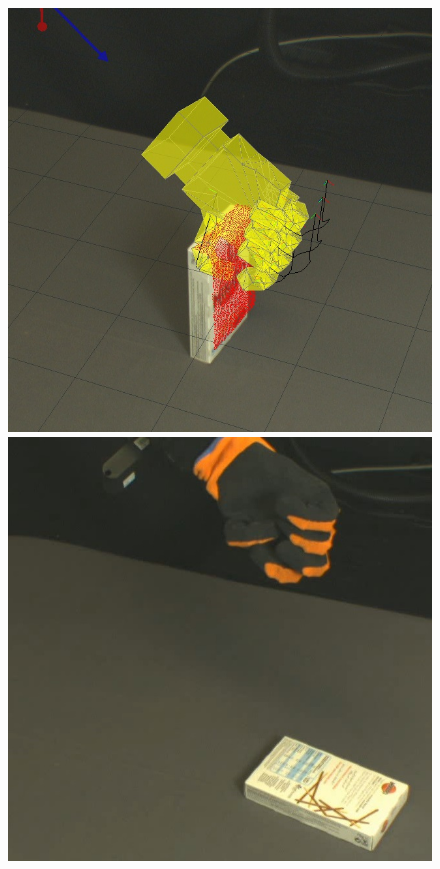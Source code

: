 \begin{figure}
\begin{center}
  \includegraphics[width=\tw]{images/experiments/query/chocsticks-1-s}
 \includegraphics[width=\tw]{images/experiments/exec/chocsticks-s}\\

\end{center}
\end{figure}
